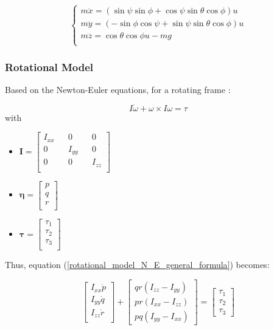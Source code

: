 \documentclass{thesisreport}
\begin{document}
\begin{equation}\label{translation_model_N_E}
\begin{cases}
m \ddot{x} = (\sin \psi \sin \phi + \cos \psi \sin \theta \cos \phi)u \\
m \ddot{y} = (- \sin \phi \cos \psi + \sin \psi \sin \theta \cos \phi )u \\
m \ddot{z} = \cos \theta \cos \phi u -mg \\
\end{cases}
\end{equation}

\newpage

\subsubsection*{Rotational Model}

Based on the Newton-Euler equations, for a rotating frame \cite{Murray1994}: 

\begin{equation}\label{rotational_model_N_E_general_formula}
I \dot{\omega} + \omega \times I \omega = \tau
\end{equation}
with

\begin{itemize}
	\item $\bm{I} = \begin{bmatrix}
	I_{xx} && 0 && 0 \\
	0 && I_{yy} && 0 \\
	0 && 0 && I_{zz} \\
	\end{bmatrix}$
	\item $\bm{\eta}=\begin{bmatrix}
	p \\
	q \\
	r \\
	\end{bmatrix}$
	\item $\bm{\tau} = \begin{bmatrix}
	\tau_1 \\
	\tau_2 \\
	\tau_3 \\
	\end{bmatrix}$
\end{itemize}

Thus, equation (\ref{rotational_model_N_E_general_formula}) becomes:

\begin{equation}
\begin{bmatrix}
I_{xx}\dot{p}\\
I_{yy}\dot{q}\\
I_{zz}\dot{r}\\
\end{bmatrix}+ \begin{bmatrix}
qr(I_{zz}-I_{yy})\\
pr(I_{xx}-I_{zz})\\
pq(I_{yy}-I_{xx})
\end{bmatrix} = \begin{bmatrix}
\tau_1 \\
\tau_2 \\
\tau_3
\end{bmatrix}
\end{equation}
\end{document}
